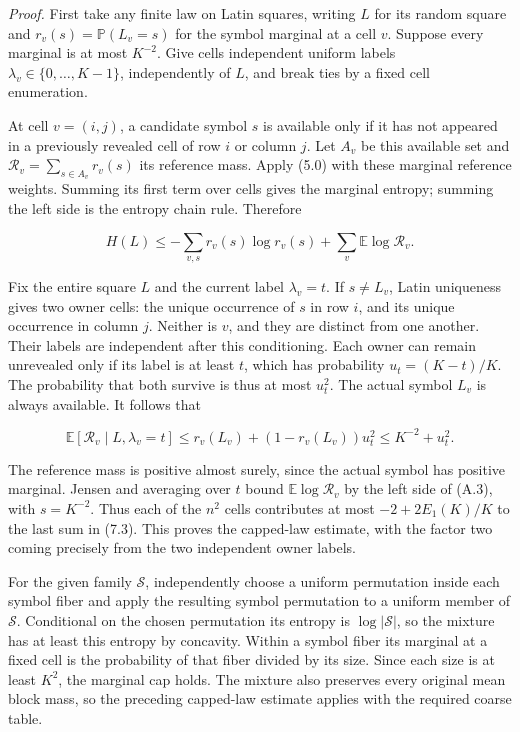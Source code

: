 \documentclass[english,11pt,a4paper]{article}
\begin{document}
\emph{Proof.} First take any finite law on Latin squares, writing \(L\) for its random square and \(r_v(s)=\mathbb P(L_v=s)\) for the symbol marginal at a cell \(v\). Suppose every marginal is at most \(K^{-2}\). Give cells independent uniform labels \(\lambda_v\in\{0,\ldots,K-1\}\), independently of \(L\), and break ties by a fixed cell enumeration.

At cell \(v=(i,j)\), a candidate symbol \(s\) is available only if it has not appeared in a previously revealed cell of row \(i\) or column \(j\). Let \(A_v\) be this available set and \(\mathcal R_v=\sum_{s\in A_v}r_v(s)\) its reference mass. Apply (5.0) with these marginal reference weights. Summing its first term over cells gives the marginal entropy; summing the left side is the entropy chain rule. Therefore

\nopagebreak[4]
\[H(L)\le-\sum_{v,s}r_v(s)\log r_v(s)
+\sum_v\mathbb E\log\mathcal R_v.\tag{7.3}\]

Fix the entire square \(L\) and the current label \(\lambda_v=t\). If \(s\ne L_v\), Latin uniqueness gives two owner cells: the unique occurrence of \(s\) in row \(i\), and its unique occurrence in column \(j\). Neither is \(v\), and they are distinct from one another. Their labels are independent after this conditioning. Each owner can remain unrevealed only if its label is at least \(t\), which has probability \(u_t=(K-t)/K\). The probability that both survive is thus at most \(u_t^2\). The actual symbol \(L_v\) is always available. It follows that

\nopagebreak[4]
\[\mathbb E[\mathcal R_v\mid L,\lambda_v=t]
\le r_v(L_v)+(1-r_v(L_v))u_t^2
\le K^{-2}+u_t^2.\tag{7.3a}\]

The reference mass is positive almost surely, since the actual symbol has positive marginal. Jensen and averaging over \(t\) bound \(\mathbb E\log\mathcal R_v\) by the left side of (A.3), with \(s=K^{-2}\). Thus each of the \(n^2\) cells contributes at most \(-2+2E_1(K)/K\) to the last sum in (7.3). This proves the capped-law estimate, with the factor two coming precisely from the two independent owner labels.

For the given family \(\mathcal S\), independently choose a uniform permutation inside each symbol fiber and apply the resulting symbol permutation to a uniform member of \(\mathcal S\). Conditional on the chosen permutation its entropy is \(\log|\mathcal S|\), so the mixture has at least this entropy by concavity. Within a symbol fiber its marginal at a fixed cell is the probability of that fiber divided by its size. Since each size is at least \(K^2\), the marginal cap holds. The mixture also preserves every original mean block mass, so the preceding capped-law estimate applies with the required coarse table.
\end{document}
